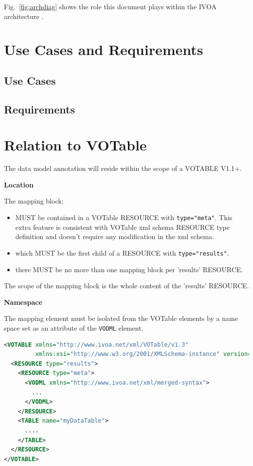 \documentclass[11pt,a4paper]{ivoa}
\begin{document}
Fig.~\ref{fig:archdiag} shows the role this document plays within
the IVOA architecture \citep{2010ivoa.rept.1123A}.


\pagebreak
\section{Use Cases and Requirements}

\subsection{Use Cases}



\subsection{Requirements}



\lstset{language=XML}

\pagebreak
\section{Relation to VOTable}

The data model annotation will reside within the scope of a VOTABLE V1.1+.


\noindent \textbf{Location}

The mapping block:
\begin{itemize}
\item MUST be contained in a VOTable RESOURCE with \texttt{type="meta"}. This extra feature is consistent with VOTable xml schema RESOURCE type definition and doesn't require any modification in the xml schema.
\item which MUST be the first child of a RESOURCE with \texttt{type="results"}.
\item there MUST be no more than one mapping block per 'results' RESOURCE.
\end{itemize}

The scope of the mapping block is the whole content of the 'results' RESOURCE. \newline

\noindent \textbf{Namespace}

The mapping element must be isolated from the VOTable elements by a name space set as an attribute of the \texttt{VODML} element.

\begin{lstlisting}[caption={Mapping block in a VOTable.},language=XML]
<VOTABLE xmlns="http://www.ivoa.net/xml/VOTable/v1.3" 
         xmlns:xsi="http://www.w3.org/2001/XMLSchema-instance" version="1.3">
  <RESOURCE type="results">
    <RESOURCE type="meta">
      <VODML xmlns="http://www.ivoa.net/xml/merged-syntax">
        ...
      </VODML>
    </RESOURCE>
    <TABLE name="myDataTable">
      ....
    </TABLE>
  </RESOURCE>
</VOTABLE>
\end{lstlisting}
\end{document}
